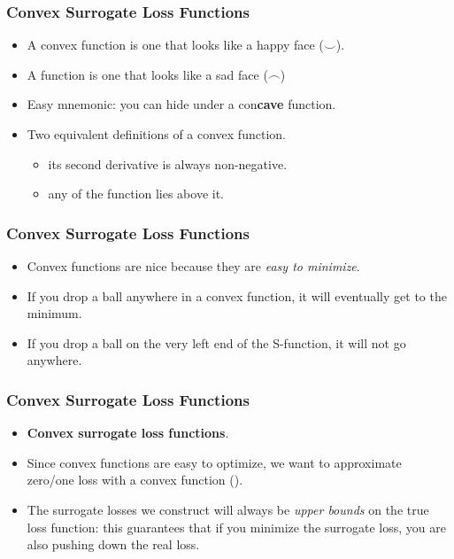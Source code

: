 \documentclass[trans,aspectratio=169]{beamer}
\begin{document}
\begin{frame}
  \frametitle{Convex Surrogate Loss Functions}
\begin{itemize}
\item 
A convex function is one that looks
like a happy face ($\smile$).
\item A 
function is one that looks like a sad face ($\frown$)
\item Easy
mnemonic:  you can hide under a con{\bf cave} function.
\item Two equivalent definitions of a convex function. 
\begin{itemize}
\item its second derivative is always non-negative.  
\item any  of the function lies
above it.
\end{itemize}
\end{itemize}
\end{frame}

\begin{frame}
  \frametitle{Convex Surrogate Loss Functions}
\begin{itemize}
\item 
Convex functions are nice because they are \emph{easy to minimize}.
\item If you drop a ball anywhere in a convex function, it will
eventually get to the minimum.  
\item If you drop a ball on the very left end of
the S-function, it will not
go anywhere.
\end{itemize}
\end{frame}

\begin{frame}
  \frametitle{Convex Surrogate Loss Functions}
\begin{itemize}
\item  {\bf Convex surrogate loss functions}.
\item Since convex functions are easy to optimize,
we want to approximate zero/one loss with a convex function ().
\item  The
surrogate losses we construct will always be \emph{upper bounds} on
the true loss function: this guarantees that if you minimize the
surrogate loss, you are also pushing down the real loss.
\end{itemize}
\end{frame}
\end{document}
